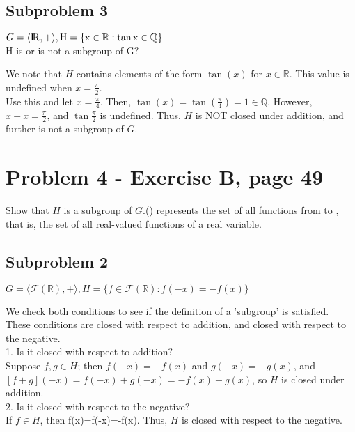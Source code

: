 \documentclass[12pt]{article}
\begin{document}
\subsection{Subproblem 3}
\begin{center}
$G=\langle \rm I\!R,+\rangle, H=\{x\in\mathbb{R}:\tan x \in \mathbb{Q}\}$\\
H is or is not a subgroup of G?
\end{center}
We note that $H$ contains elements of the form $\tan(x)$ for $x \in \mathbb{R}$. This value is undefined when $x=\frac{\pi}{2}$.\\
Use this and let $x=\frac{\pi}{4}$. Then, $\tan(x)=\tan(\frac{\pi}{4})=1 \in \mathbb{Q}$. However, $x+x=\frac{\pi}{2}$, and $\tan\frac{\pi}{2}$ is undefined. Thus, $H$ is NOT closed under addition, and further is not a subgroup of $G$.

\section{Problem 4 - Exercise B, page 49}
Show that $H$ is a subgroup of $G$.() represents the set of all functions from  to , that is, the set of all real-valued functions of a real variable.
\subsection{Subproblem 2}
\begin{center}
$G=\langle \mathcal{F}(\mathbb{R}),+\rangle, H=\{f \in \mathcal{F}(\mathbb{R}):f(-x)=-f(x)\}$
\end{center}
We check both conditions to see if the definition of a 'subgroup' is satisfied. These conditions are closed with respect to addition, and closed with respect to the negative.\\
1. Is it closed with respect to addition?\\
Suppose $f, g \in H$; then $f(-x)=-f(x)$ and $g(-x)=-g(x)$, and $[f+g](-x)=f(-x)+g(-x)=-f(x)-g(x)$, so $H$ is closed under addition.\\
2. Is it closed with respect to the negative?\\
If $f \in H$, then f(x)=f(-x)=-f(x). Thus, $H$ is closed with respect to the negative.
\end{document}

